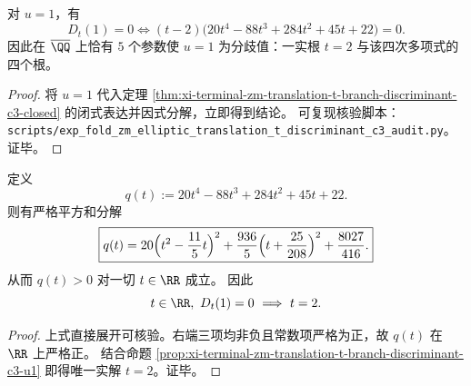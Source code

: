 \begin{proposition}[\texorpdfstring{$u=1$}{u=1} 进入分歧值的完整代数条件]\label{prop:xi-terminal-zm-translation-t-branch-discriminant-c3-u1}
对 \(u=1\)，有
\[
\boxed{
D_t(1)=0\iff (t-2)\bigl(20t^4-88t^3+284t^2+45t+22\bigr)=0.}
\]
因此在 \(\overline{\QQ}\) 上恰有 \(5\) 个参数使 \(u=1\) 为分歧值：一实根 \(t=2\) 与该四次多项式的四个根。
\end{proposition}
\begin{proof}
将 \(u=1\) 代入定理 \ref{thm:xi-terminal-zm-translation-t-branch-discriminant-c3-closed} 的闭式表达并因式分解，立即得到结论。
可复现核验脚本：\texttt{scripts/exp\_fold\_zm\_elliptic\_translation\_t\_discriminant\_c3\_audit.py}。证毕。
\end{proof}

\begin{theorem}[四次因子的严格正性与唯一实 \texorpdfstring{$u=1$}{u=1} 共振]\label{thm:xi-terminal-zm-translation-t-branch-discriminant-c3-u1-positivity}
定义
\[
q(t):=20t^4-88t^3+284t^2+45t+22.
\]
则有严格平方和分解
\[
\boxed{
q(t)=20\Bigl(t^2-\frac{11}{5}t\Bigr)^2+\frac{936}{5}\Bigl(t+\frac{25}{208}\Bigr)^2+\frac{8027}{416}.}
\]
从而 \(q(t)>0\) 对一切 \(t\in\RR\) 成立。
因此
\[
t\in\RR,\ D_t(1)=0\ \Longrightarrow\ t=2.
\]
\end{theorem}
\begin{proof}
上式直接展开可核验。右端三项均非负且常数项严格为正，故 \(q(t)\) 在 \(\RR\) 上严格正。
结合命题 \ref{prop:xi-terminal-zm-translation-t-branch-discriminant-c3-u1} 即得唯一实解 \(t=2\)。证毕。
\end{proof}

